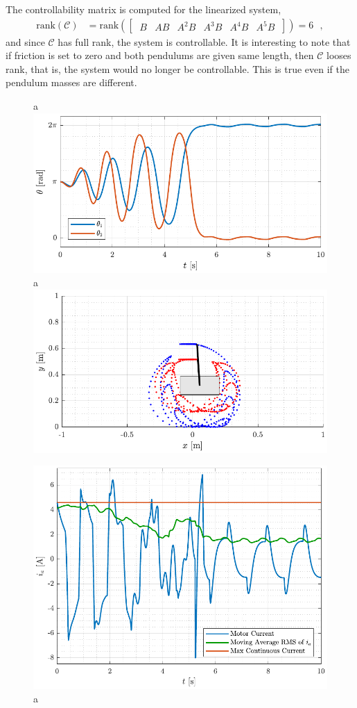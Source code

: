 %
The controllability matrix is computed for the linearized system,
\begin{align}
  \mathrm{rank}(\mathcal{C}) &= \mathrm{rank}([\ \begin{matrix} B & AB & A^2 B & A^3 B & A^4 B & A^5 B \end{matrix}\ ]) = 6  \ \ \ ,
\end{align}
and since $\mathcal{C}$ has full rank, the system is controllable. It is interesting to note that if friction is set to zero and both pendulums are given same length, then $\mathcal{C}$ looses rank, that is, the system would no longer be controllable. This is true even if the pendulum masses are different.
%

\begin{figure}[H]
  \hspace{-10pt}
  \captionbox 
  {
    a
    \label{fig:theta_twinSwingAndCatch}
  }
  {
    \hspace{-1cm}
    \includegraphics[width=.46\textwidth]{figures/theta_twinSwingAndCatch}
  }
  \hspace{20pt}
  \captionbox 
  {
    a
    \label{fig:ani_twinSwingAndCatch}
  }
  {
    \hspace{-1cm}
    \includegraphics[width=.46\textwidth]{figures/ani_twinSwingAndCatch}
  }
\end{figure}
%
%
\begin{figure}[H]
  \includegraphics[width=.5\textwidth]{figures/ia_twinSwingAndCatch}
  \caption{a}
  \label{fig:ia_twinSwingAndCatch}
\end{figure}
